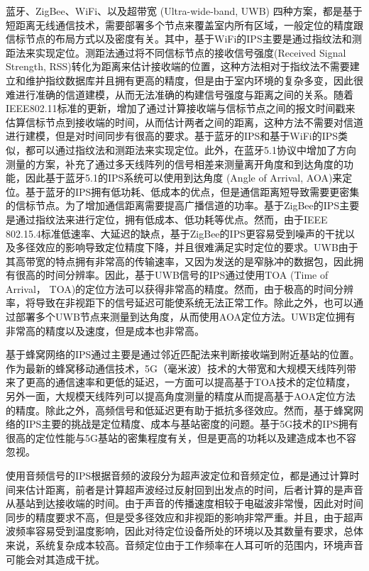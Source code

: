 蓝牙、ZigBee、WiFi、以及超带宽 (Ultra-wide-band, UWB) 四种方案，都是基于短距离无线通信技术，需要部署多个节点来覆盖室内所有区域，一般定位的精度跟信标节点的布局方式以及密度有关。其中，基于WiFi的IPS主要是通过指纹法和测距法来实现定位\cite{wifi}。测距法通过将不同信标节点的接收信号强度(Received Signal Strength, RSS)转化为距离来估计接收端的位置，这种方法相对于指纹法不需要建立和维护指纹数据库并且拥有更高的精度，但是由于室内环境的复杂多变，因此很难进行准确的信道建模，从而无法准确的构建信号强度与距离之间的关系。随着IEEE802.11标准的更新，增加了通过计算接收端与信标节点之间的报文时间戳来估算信标节点到接收端的时间，从而估计两者之间的距离，这种方法不需要对信道进行建模，但是对时间同步有很高的要求。基于蓝牙的IPS和基于WiFi的IPS类似，都可以通过指纹法和测距法来实现定位\cite{bluetooth}。此外，在蓝牙5.1协议中增加了方向测量的方案，补充了通过多天线阵列的信号相差来测量离开角度和到达角度的功能，因此基于蓝牙5.1的IPS系统可以使用到达角度 (Angle of Arrival, AOA)来定位。基于蓝牙的IPS拥有低功耗、低成本的优点，但是通信距离短导致需要更密集的信标节点。为了增加通信距离需要提高广播信道的功率。基于ZigBee的IPS主要是通过指纹法来进行定位，拥有低成本、低功耗等优点。然而，由于IEEE 802.15.4标准低速率、大延迟的缺点，基于ZigBee的IPS更容易受到噪声的干扰以及多径效应的影响导致定位精度下降，并且很难满足实时定位的要求\cite{ZigBee}。UWB由于其高带宽的特点拥有非常高的传输速率，又因为发送的是窄脉冲的数据包，因此拥有很高的时间分辨率\cite{uwb}。因此，基于UWB信号的IPS通过使用TOA (Time of Arrival， TOA)的定位方法可以获得非常高的精度。然而，由于极高的时间分辨率，将导致在非视距下的信号延迟可能使系统无法正常工作。除此之外，也可以通过部署多个UWB节点来测量到达角度，从而使用AOA定位方法。UWB定位拥有非常高的精度以及速度，但是成本也非常高。

基于蜂窝网络的IPS通过主要是通过邻近匹配法来判断接收端到附近基站的位置\cite{LTE}。作为最新的蜂窝移动通信技术，5G（毫米波）技术的大带宽和大规模天线阵列带来了更高的通信速率和更低的延迟，一方面可以提高基于TOA技术的定位精度，另外一面，大规模天线阵列可以提高角度测量的精度从而提高基于AOA定位方法的精度。除此之外，高频信号和低延迟更有助于抵抗多径效应。然而，基于蜂窝网络的IPS主要的挑战是定位精度、成本与基站密度的问题。基于5G技术的IPS拥有很高的定位性能与5G基站的密集程度有关，但是更高的功耗以及建造成本也不容忽视\cite{5g}。

使用音频信号的IPS根据音频的波段分为超声波定位和音频定位，都是通过计算时间来估计距离，前者是计算超声波经过反射回到出发点的时间\cite{室内超声波定位系统}，后者计算的是声音从基站到达接收端的时间\cite{曹帅2020面向智能移动终端的音频室内定位关键技术研究}。由于声音的传播速度相较于电磁波非常慢，因此对时间同步的精度要求不高，但是受多径效应和非视距的影响非常严重。并且，由于超声波频率容易受到温度影响，因此对待定位设备所处的环境以及其数量有要求，总体来说，系统复杂成本较高。音频定位由于工作频率在人耳可听的范围内，环境声音可能会对其造成干扰。

